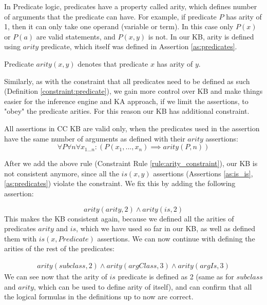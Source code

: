 In Predicate logic, predicates have a property called arity, which defines 
number of arguments that the predicate can have. For example, if predicate
$P$ has arity of 1, then it can only take one operand (variable or term). In 
this case only $P(x)$ or $P(a)$ are valid statements, and $P(x,y)$ is not.
In our KB, arity is defined using $arity$ predicate, which itself was defined
in Assertion \ref{as:predicates}.

\begin{definition}\label{def:arity}
Predicate $arity(x,y)$ denotes that predicate $x$ has arity of $y$.
\end{definition}

Similarly, as with the constraint that all predicates need to be defined as
such (Definition \autoref{constraint:predicate}), we gain more control over 
KB and make things easier for the inference engine and KA approach, if we 
limit the assertions, to "obey" the predicate arities. For this reason our KB
has additional constraint.

\begin{definition}\label{constraint:arity}
All assertions in CC KB are valid only, when the predicates used in the 
assertion have the same number of arguments as defined with their $arity$ 
assertions:
\begin{equation}\label{rule:arity_constraint}
\forall P \forall n \forall x_{1...n}:(P(x_1,...,x_n) \implies arity(P,n))
\end{equation}
\end{definition}

After we add the above rule (Constraint Rule \ref{rule:arity_constraint}), our 
KB is not consistent anymore, since all the $is(x,y)$ assertions (Assertions 
\ref{as:is_is}, \ref{as:predicates}) violate the constraint. We fix this by 
adding the following assertion:

\begin{equation}\label{as:arity_is}
arity(arity,2) \land arity(is,2)
\end{equation}
This makes the KB consistent again, because we defined all the arities of
predicates $arity$ and $is$, which we have used so far in our KB, as well as 
defined them with $is(x, Predicate)$ assertions. We can now continue with 
defining the arities of the rest of the predicates:

\begin{equation}\label{as:arity_predicates}
\begin{gathered}
arity(subclass, 2) \land arity(argClass,3) \land arity(argIs,3)
\end {gathered}
\end{equation}
We can see now that the arity of $is$ predicate is defined as 2 (same as for 
$subclass$ and $arity$, which can be used to define arity of itself), and can 
confirm that all the logical formulas in the definitions up to now are correct.

